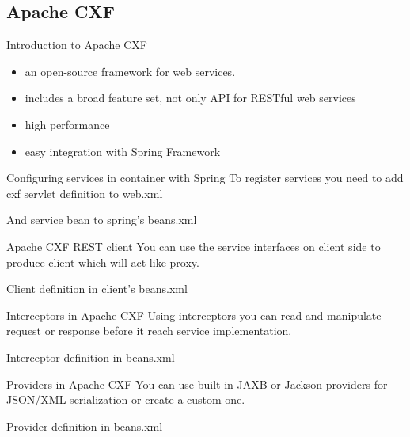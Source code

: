 \subsection{Apache CXF}
	\begin{frame}{Introduction to Apache CXF}
		\begin{itemize}
		  \item an open-source framework for web services.
		  \item includes a broad feature set, not only API for RESTful web services
		  \item high performance
		  \item easy integration with Spring Framework
		\end{itemize}	
	\end{frame}
	
	\begin{frame}{Configuring services in container with Spring}
		To register services you need to add cxf servlet definition to web.xml
		
		And service bean to spring's beans.xml
		
	\end{frame}
	
	\begin{frame}{Apache CXF REST client}
		You can use the service interfaces on client side to produce client which will act like proxy.
		
		
		
		Client definition in client's beans.xml
		
	\end{frame}
	
	\begin{frame}{Interceptors in Apache CXF}
		Using interceptors you can read and manipulate request or response before it reach service implementation.
		
		
		
		Interceptor definition in beans.xml
		
	\end{frame}
	
	\begin{frame}{Providers in Apache CXF}
		You can use built-in JAXB or Jackson providers for JSON/XML serialization or create a custom one.
		  
			
		   
		Provider definition in beans.xml
		
	\end{frame}
	
